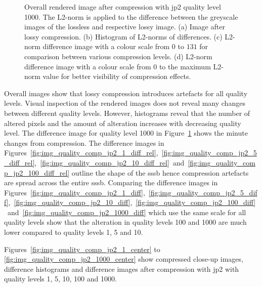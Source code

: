 \begin{figure}[htb]
\begin{subfigure}[b]{0.48\textwidth}
        \caption{}
        \label{fig:img_quality_comp_jp2_1000_diff_rel}
    \end{subfigure}
    \caption{Overall rendered image after compression with \gls{jp2} quality level 1000. The L2-norm is applied to the difference between the greyscale images of the lossless and respective lossy image. (a) Image after lossy compression. (b) Histogram of L2-norms of differences. (c) L2-norm difference image with a colour scale from $0$ to $131$ for comparison between various compression levels. (d) L2-norm difference image with a colour scale from $0$ to the maximum L2-norm value for better visibility of compression effects.}
    \label{fig:img_quality_comp_jp2_1000}
\end{figure}
\clearpage
Overall images show that lossy compression introduces artefacts for all quality levels. Visual inspection of the rendered images does not reveal many changes between different quality levels. However, histograms reveal that the number of altered pixels and the amount of alteration increases with decreasing quality level. The difference image for quality level 1000 in Figure~\ref{fig:img_quality_comp_jp2_1000_diff_rel} shows the minute changes from compression. The difference images in Figures~\ref{fig:img_quality_comp_jp2_1_diff_rel},~\ref{fig:img_quality_comp_jp2_5_diff_rel},~\ref{fig:img_quality_comp_jp2_10_diff_rel}~and~\ref{fig:img_quality_comp_jp2_100_diff_rel} outline the shape of the \gls{sssb} hence compression artefacts are spread across the entire \gls{sssb}. Comparing the difference images in Figures~\ref{fig:img_quality_comp_jp2_1_diff},~\ref{fig:img_quality_comp_jp2_5_diff},~\ref{fig:img_quality_comp_jp2_10_diff},~\ref{fig:img_quality_comp_jp2_100_diff}~and~\ref{fig:img_quality_comp_jp2_1000_diff} which use the same scale for all quality levels show that the alteration in quality levels \SI{100}{} and \SI{1000}{} are much lower compared to quality levels \SI{1}{}, \SI{5}{} and \SI{10}{}.

Figures~\ref{fig:img_quality_comp_jp2_1_center} to \ref{fig:img_quality_comp_jp2_1000_center} show compressed close-up images, difference histograms and difference images after compression with \gls{jp2} with quality levels \SI{1}{}, \SI{5}{}, \SI{10}{}, \SI{100}{} and \SI{1000}{}.

